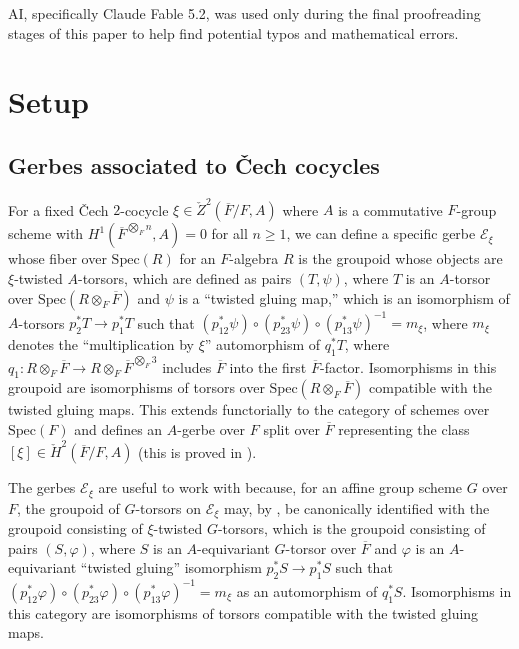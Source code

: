 \documentclass{amsart}
\theoremstyle{definition}
\theoremstyle{remark}
\newcommand\Spec{\mathrm{Spec}}
\newcommand{\ov}{\overline}
\begin{document}
AI, specifically Claude Fable 5.2, was used only during the final proofreading stages of this paper to help find potential typos and mathematical errors. 

\section{Setup}\label{sec:setup}

\subsection{Gerbes associated to \v{C}ech cocycles}\label{sec:gerbeb}
For a fixed \v{C}ech $2$-cocycle $\xi \in \check{Z}^{2}(\ov{F}/F,A)$ where $A$ is a commutative $F$-group scheme with $H^{1}(\ov{F}^{\bigotimes_{F} n},A)=0$ for all $n\geq 1$, we can define a specific gerbe $\mathcal{E}_{\xi}$ whose fiber over $\Spec(R)$ for an $F$-algebra $R$ is the groupoid whose objects are $\xi$-twisted $A$-torsors, which are defined as pairs $(T,\psi)$, where $T$ is an $A$-torsor over $\Spec(R \otimes_{F} \ov{F})$ and $\psi$ is a ``twisted gluing map,'' which is an isomorphism of $A$-torsors $p_{2}^{*}T \to p_{1}^{*}T$ such that $(p_{12}^{*}\psi) \circ (p_{23}^{*}\psi) \circ (p_{13}^{*}\psi)^{-1} =m_{\xi}$, where $m_{\xi}$ denotes the ``multiplication by $\xi$'' automorphism of $q_{1}^{*}T$, where $q_{1} \colon R \otimes_{F}\ov{F}  \to R \otimes_{F}\ov{F}^{\bigotimes_{F} 3}$ includes $\ov{F}$ into the first $\ov{F}$-factor. Isomorphisms in this groupoid are isomorphisms of torsors over $\Spec(R \otimes_{F} \ov{F})$ compatible with the twisted gluing maps. This extends functorially to the category of schemes over $\Spec(F)$ and defines an $A$-gerbe over $F$ split over $\ov{F}$ representing the class $[\xi] \in \check{H}^{2}(\ov{F}/F, A)$ (this is proved in \cite[Proposition 2.36]{Dillery1}).

The gerbes $\mathcal{E}_{\xi}$ are useful to work with because, for an affine group scheme $G$ over $F$, the groupoid of $G$-torsors on $\mathcal{E}_{\xi}$ may, by \cite[Proposition 2.50]{Dillery1}, be canonically identified with the groupoid consisting of $\xi$-twisted $G$-torsors, which is the groupoid consisting of pairs $(S,\varphi)$, where $S$ is an $A$-equivariant $G$-torsor over $\ov{F}$ and $\varphi$ is an $A$-equivariant ``twisted gluing'' isomorphism $p_{2}^{*}S \to p_{1}^{*}S$ such that $(p_{12}^{*}\varphi) \circ (p_{23}^{*}\varphi) \circ (p_{13}^{*}\varphi)^{-1} =m_{\xi}$ as an automorphism of $q_{1}^{*}S$. Isomorphisms in this category are isomorphisms of torsors compatible with the twisted gluing maps. 
\end{document}

